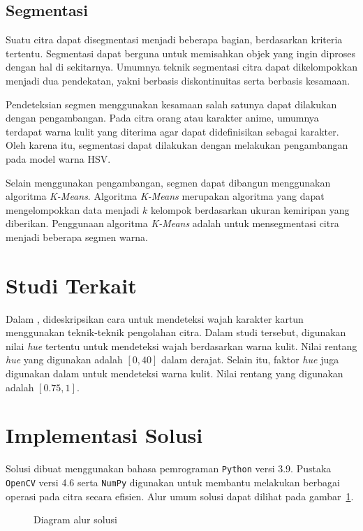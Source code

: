 \documentclass[conference, a4paper]{IEEEtran}
\begin{document}
\subsection{Segmentasi}
Suatu citra dapat disegmentasi menjadi beberapa bagian, berdasarkan kriteria tertentu. Segmentasi dapat berguna untuk memisahkan objek yang ingin diproses dengan hal di sekitarnya. Umumnya teknik segmentasi citra dapat dikelompokkan menjadi dua pendekatan, yakni berbasis diskontinuitas serta berbasis kesamaan.

Pendeteksian segmen menggunakan kesamaan salah satunya dapat dilakukan dengan pengambangan. Pada citra orang atau karakter anime, umumnya terdapat warna kulit yang diterima agar dapat didefinisikan sebagai karakter. Oleh karena itu, segmentasi dapat dilakukan dengan melakukan pengambangan pada model warna HSV.

Selain menggunakan pengambangan, segmen dapat dibangun menggunakan algoritma \textit{K-Means}. Algoritma \textit{K-Means} merupakan algoritma yang dapat mengelompokkan data menjadi $k$ kelompok berdasarkan ukuran kemiripan yang diberikan. Penggunaan algoritma \textit{K-Means} adalah untuk mensegmentasi citra menjadi beberapa segmen warna.

\section{Studi Terkait}
Dalam \cite{takayama2012face}, dideskripsikan cara untuk mendeteksi wajah karakter kartun menggunakan teknik-teknik pengolahan citra. Dalam studi tersebut, digunakan nilai \textit{hue} tertentu untuk mendeteksi wajah berdasarkan warna kulit. Nilai rentang \textit{hue} yang digunakan adalah $[0, 40]$ dalam derajat. Selain itu, faktor \textit{hue} juga digunakan dalam untuk mendeteksi warna kulit. Nilai rentang yang digunakan adalah $[0.75, 1]$.

\section{Implementasi Solusi}
Solusi dibuat menggunakan bahasa pemrograman \texttt{Python} versi 3.9. Pustaka \texttt{OpenCV} versi 4.6 serta \texttt{NumPy} digunakan untuk membantu melakukan berbagai operasi pada citra secara efisien. Alur umum solusi dapat dilihat pada gambar~\ref{sol}.

\begin{figure}[ht]
  
  \caption{Diagram alur solusi}\label{sol}
\end{figure}
\end{document}
